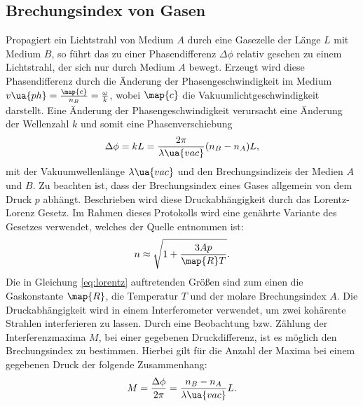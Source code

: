 \subsection{Brechungsindex von Gasen}
Propagiert ein Lichtstrahl von Medium $A$ durch eine Gasezelle der Länge $L$ mit Medium $B$,
so führt das zu einer Phasendifferenz $\Delta\phi$ relativ gesehen zu einem Lichtstrahl, der sich
nur durch Medium $A$ bewegt. Erzeugt wird diese Phasendifferenz durch die Änderung der
Phasengeschwindigkeit im Medium $v\ua{ph}=\frac{\map{c}}{n_B}=\frac{\omega}{k}$, wobei $\map{c}$
die Vakuumlichtgeschwindigkeit darstellt. Eine Änderung der Phasengeschwindigkeit
verursacht eine Änderung der Wellenzahl $k$ und somit eine Phasenverschiebung
\begin{equation}
  \label{eq:phase_shit_gases}
\Delta\phi = kL = \frac{2\pi}{\lambda\ua{vac}}(n_B-n_A)L,
\end{equation}
mit der Vakuumwellenlänge $\lambda\ua{vac}$ und den Brechungsindizeis der
Medien $A$ und $B$.
Zu beachten ist, dass der Brechungsindex eines Gases allgemein von dem Druck $p$ abhängt.
Beschrieben wird diese Druckabhängigkeit durch das Lorentz-Lorenz Gesetz.
Im Rahmen dieses Protokolls wird eine genährte Variante des Gesetzes verwendet,
welches der Quelle \cite{lorentz} entnommen ist:
\begin{equation}
  \label{eq:lorentz}
  n\approx \sqrt{1+\frac{ 3Ap }{ \map{R}T } }.
\end{equation}
Die in Gleichung \eqref{eq:lorentz} auftretenden Größen sind
zum einen die Gaskonstante $\map{R}$, die Temperatur $T$ und der
molare Brechungsindex $A$.
Die Druckabhängigkeit wird in einem Interferometer verwendet, um zwei kohärente Strahlen interferieren zu lassen.
Durch eine Beobachtung bzw. Zählung der Interferenzmaxima $M$, bei einer gegebenen Druckdifferenz, ist es möglich den Brechungsindex zu bestimmen.
Hierbei gilt für die Anzahl der Maxima bei einem gegebenen Druck der folgende Zusammenhang:
\begin{equation}
  \label{eq:anzahl_maxima_gas}
  M=\frac{\Delta\phi}{2\pi}= \frac{ n_B-n_A }{ \lambda\ua{vac} }L.
\end{equation}

